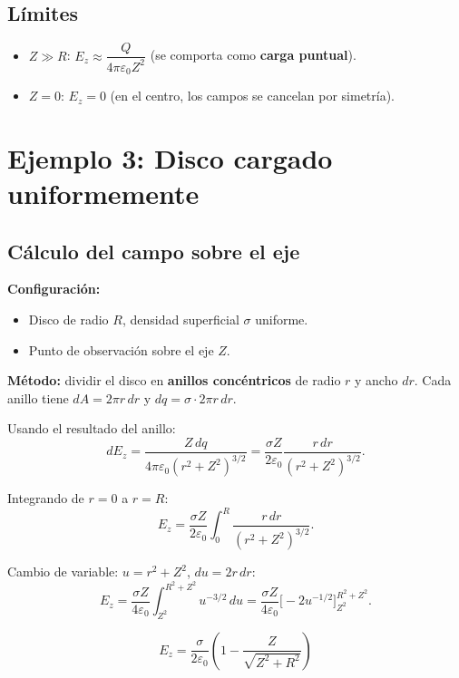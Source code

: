 \documentclass[12pt,a4paper]{article}
\begin{document}
\subsection{Límites}

\begin{itemize}[nosep]
  \item \textbf{$Z \gg R$}: $E_z \approx \dfrac{Q}{4\pi\varepsilon_0
        Z^{2}}$ (se comporta como \textbf{carga puntual}).
  \item \textbf{$Z = 0$}: $E_z = 0$ (en el centro, los campos se
        cancelan por simetría).
\end{itemize}

\section{Ejemplo 3: Disco cargado uniformemente}

\subsection{Cálculo del campo sobre el eje}

\textbf{Configuración:}
\begin{itemize}[nosep]
  \item Disco de radio $R$, densidad superficial $\sigma$ uniforme.
  \item Punto de observación sobre el eje $Z$.
\end{itemize}

\textbf{Método:} dividir el disco en \textbf{anillos concéntricos} de
radio $r$ y ancho $dr$. Cada anillo tiene $dA = 2\pi r\,dr$ y
$dq = \sigma \cdot 2\pi r\,dr$.

Usando el resultado del anillo:
\[
dE_z = \frac{Z \, dq}{4\pi\varepsilon_0 (r^{2} + Z^{2})^{3/2}}
     = \frac{\sigma Z}{2\varepsilon_0}
       \frac{r\,dr}{(r^{2} + Z^{2})^{3/2}}.
\]

Integrando de $r = 0$ a $r = R$:
\[
E_z = \frac{\sigma Z}{2\varepsilon_0}
      \int_0^R \frac{r\,dr}{(r^{2} + Z^{2})^{3/2}}.
\]

Cambio de variable: $u = r^{2} + Z^{2}$, $du = 2r\,dr$:
\[
E_z = \frac{\sigma Z}{4\varepsilon_0}
      \int_{Z^{2}}^{R^{2}+Z^{2}} u^{-3/2} \, du
    = \frac{\sigma Z}{4\varepsilon_0}
      \bigl[-2 u^{-1/2}\bigr]_{Z^{2}}^{R^{2}+Z^{2}}.
\]

\begin{keybox}
  \[
  \boxed{
  E_z = \frac{\sigma}{2\varepsilon_0}
        \left(1 - \frac{Z}{\sqrt{Z^{2} + R^{2}}}\right)
  }
  \]
\end{keybox}
\end{document}
